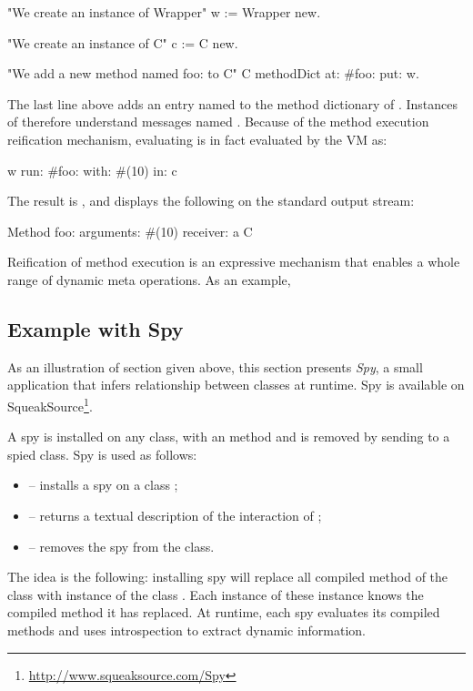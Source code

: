 \documentclass[a4paper,10pt,twoside]{book}
\begin{document}
\begin{code}{}
"We create an instance of Wrapper"
w := Wrapper new.

"We create an instance of C"
c := C new.

"We add a new method named foo: to C"
C methodDict at: #foo: put: w.
\end{code}

The last line above adds an entry named  to the method dictionary of . Instances of  therefore understand messages named . Because of the method execution reification mechanism, evaluating  is in fact evaluated by the VM as:

\begin{code}{}
w run: #foo: with: #(10) in: c
\end{code}

The result is , and displays the following on the standard output stream:

\begin{code}{}
Method foo: arguments: #(10) receiver: a C
\end{code}

Reification of method execution is an expressive mechanism that enables a whole range of dynamic meta operations. As an example, 

\subsection{Example with Spy}

As an illustration of section given above, this section presents \emph{Spy}, a small application that infers relationship between classes at runtime. Spy is available on SqueakSource\footnote{\url{http://www.squeaksource.com/Spy}}. 

A spy is installed on any class, with an  method and is removed by sending  to a spied class. Spy is used as follows: 
\begin{itemize}
\item {} -- installs a spy on a class ;
\item {} -- returns a textual description of the interaction of ;
\item {} -- removes the spy from the class.
\end{itemize}

The idea is the following: installing spy will replace all compiled method of the class with instance of the class . Each instance of these instance knows the compiled method it has replaced. At runtime, each spy evaluates its compiled methods and uses introspection to extract dynamic information.
\end{document}
